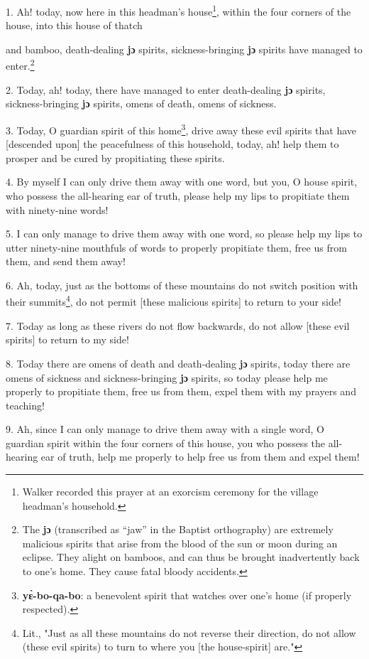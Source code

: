 \setcounter{footnote}{0}

1. Ah! today, now here in this headman's house\footnote{Walker recorded this prayer at an exorcism ceremony for the village headman's household.}, within the four corners of the
house, into this house of thatch

and bamboo, death-dealing\textbf{ jɔ }spirits, sickness-bringing\textbf{ jɔ}
spirits have managed to enter.\footnote{The \textbf{jɔ} (transcribed as ``jaw'' in the Baptist orthography) are extremely malicious spirits that arise from the blood of the sun or moon during an eclipse. They alight on bamboos, and can thus be brought inadvertently back to one's home. They cause fatal bloody accidents.}

2. Today, ah! today, there have managed to enter death-dealing \textbf{jɔ} spirits,
sickness-bringing\textbf{ jɔ} spirits, omens of death, omens of sickness.

3. Today, O guardian spirit of this home\footnote{\textbf{yɛ̀-bo-qa-bo}: a benevolent spirit that watches over one's home (if properly respected).}, drive away these evil spirits that
have [descended upon] the peacefulness of this household, today, ah! help them
to prosper and be cured by propitiating these spirits.

4. By myself I can only drive them away with one word, but you, O house spirit,
who possess the all-hearing ear of truth, please help my lips to propitiate them
with ninety-nine words!

5. I can only manage to drive them away with one word, so please help my lips to
utter ninety-nine mouthfuls of words to properly propitiate them, free us from
them, and send them away!

6. Ah, today, just as the bottoms of these mountains do not switch position with
their summits\footnote{Lit., "Just as all these mountains do not reverse their direction, do not allow (these evil spirits) to turn to where you [the house-spirit] are."}, do not permit [these malicious spirits] to return to your side!

7. Today as long as these rivers do not flow backwards, do not allow [these evil
spirits] to return to my side!

8. Today there are omens of death and death-dealing\textbf{ jɔ }spirits, today
there are omens of sickness and sickness-bringing\textbf{ jɔ }spirits, so today
please help me properly to propitiate them, free us from them, expel them with
my prayers and teaching!

9. Ah, since I can only manage to drive them away with a single word, O guardian
spirit within the four corners of this house, you who possess the all-hearing ear
of truth, help me properly to help free us from them and expel them!


